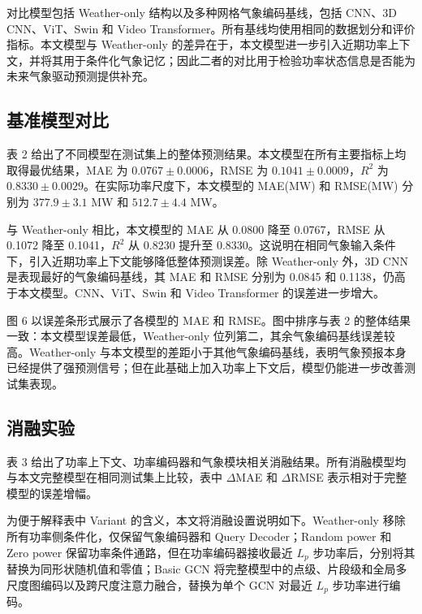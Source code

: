 
对比模型包括 Weather-only 结构以及多种网格气象编码基线，包括 CNN、3D CNN、ViT、Swin 和 Video Transformer。所有基线均使用相同的数据划分和评价指标。本文模型与 Weather-only 的差异在于，本文模型进一步引入近期功率上下文，并将其用于条件化气象记忆；因此二者的对比用于检验功率状态信息是否能为未来气象驱动预测提供补充。

\subsection{基准模型对比}

表 2 给出了不同模型在测试集上的整体预测结果。本文模型在所有主要指标上均取得最优结果，MAE 为 \(0.0767\pm0.0006\)，RMSE 为 \(0.1041\pm0.0009\)，\(R^2\) 为 \(0.8330\pm0.0029\)。在实际功率尺度下，本文模型的 MAE(MW) 和 RMSE(MW) 分别为 \(377.9\pm3.1\) MW 和 \(512.7\pm4.4\) MW。


与 Weather-only 相比，本文模型的 MAE 从 0.0800 降至 0.0767，RMSE 从 0.1072 降至 0.1041，\(R^2\) 从 0.8230 提升至 0.8330。这说明在相同气象输入条件下，引入近期功率上下文能够降低整体预测误差。除 Weather-only 外，3D CNN 是表现最好的气象编码基线，其 MAE 和 RMSE 分别为 0.0845 和 0.1138，仍高于本文模型。CNN、ViT、Swin 和 Video Transformer 的误差进一步增大。


图 6 以误差条形式展示了各模型的 MAE 和 RMSE。图中排序与表 2 的整体结果一致：本文模型误差最低，Weather-only 位列第二，其余气象编码基线误差较高。Weather-only 与本文模型的差距小于其他气象编码基线，表明气象预报本身已经提供了强预测信号；但在此基础上加入功率上下文后，模型仍能进一步改善测试集表现。

\subsection{消融实验}

表 3 给出了功率上下文、功率编码器和气象模块相关消融结果。所有消融模型均与本文完整模型在相同测试集上比较，表中 \(\Delta\)MAE 和 \(\Delta\)RMSE 表示相对于完整模型的误差增幅。

为便于解释表中 Variant 的含义，本文将消融设置说明如下。Weather-only 移除所有功率侧条件化，仅保留气象编码器和 Query Decoder；Random power 和 Zero power 保留功率条件通路，但在功率编码器接收最近 \(L_p\) 步功率后，分别将其替换为同形状随机值和零值；Basic GCN 将完整模型中的点级、片段级和全局多尺度图编码以及跨尺度注意力融合，替换为单个 GCN 对最近 \(L_p\) 步功率进行编码。

